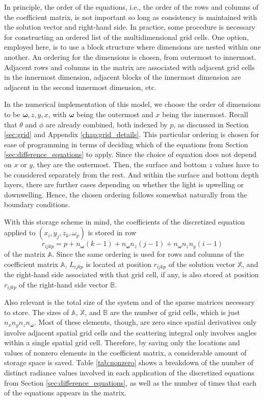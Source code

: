 \documentclass[ms,cpyr,lof,lot]{uathesis}
\renewcommand\vec\bm
\newcommand\nomega{{n_{\vec{\omega}}}}
\begin{document}
In principle, the order of the equations, i.e., the order of the rows and columns of the coefficient matrix, is not important
so long as consistency is maintained with the solution vector and right-hand side.
In practice, some procedure is necessary for constructing an ordered list of the multidimensional grid cells.
One option, employed here, is to use a block structure where dimensions are nested within one another.
An ordering for the dimensions is chosen, from outermost to innermost.
Adjacent rows and columns in the matrix are associated with adjacent grid cells in the innermost dimension,
adjacent blocks of the innermost dimension are adjacent in the second innermost dimension, etc.

In the numerical implementation of this model, we choose the order of dimensions to be $\vec{\omega}, z, y, x$, with $\vec{\omega}$ being the outermost and $x$ being the innermost.
Recall that $\theta$ and $\phi$ are already combined, both indexed by $p$, as discussed in Section \ref{sec:grid} and Appendix \ref{chap:grid_details}.
This particular ordering is chosen for ease of programming in terms of deciding which of the equations from Section \ref{sec:difference_equations} to apply.
Since the choice of equation does not depend on $x$ or $y$, they are the outermost.
Then, the surface and bottom $z$ values have to be considered separately from the rest.
And within the surface and bottom depth layers, there are further cases depending on whether the light is upwelling or downwelling.
Hence, the chosen ordering follows somewhat naturally from the boundary conditions.

With this storage scheme in mind, the coefficients of the discretized equation applied to $(x_i, y_j, z_k, \omega_p)$ is stored in row
\begin{equation*}
  r_{ijkp} = p + \nomega (k-1) + \nomega n_z (j-1) + \nomega n_z n_y (i-1)
\end{equation*}
of the matrix $\mathbb{A}$.
Since the same ordering is used for rows and columns of the coefficient matrix $\mathbb{A}$, $L_{ijkp}$ is located at position $r_{ijkp}$ of the solution vector $\mathbb{X}$,
and the right-hand side associated with that grid cell, if any, is also stored at position $r_{ijkp}$ of the right-hand side vector $\mathbb{B}$.

Also relevant is the total size of the system and of the sparse matrices necessary to store.
The sizes of $\mathbb{A}$, $\mathbb{X}$, and $\mathbb{B}$ are the number of grid cells, which is just $n_xn_yn_z\nomega$.
Most of these elements, though, are zero since spatial derivatives only involve adjacent spatial grid cells and the scattering integral only involves angles within a single spatial grid cell.
Therefore, by saving only the locations and values of nonzero elements in the coefficient matrix, a considerable amount of storage space is saved.
Table \ref{tab:nonzero} shows a breakdown of the number of distinct radiance values involved in each application of the discretized equations from Section \ref{sec:difference_equations}, as well as the number of times that each of the equations appears in the matrix.
\end{document}
